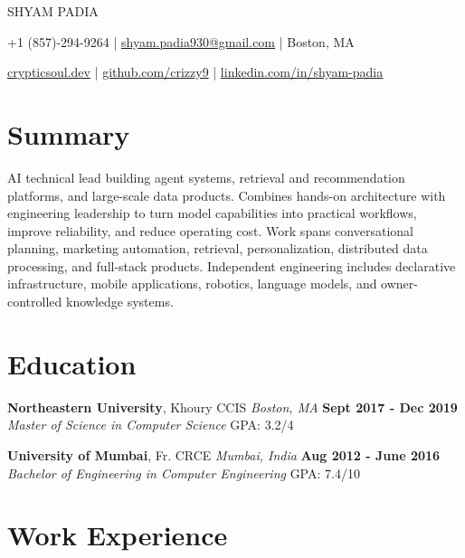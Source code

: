 \documentclass[10pt, letterpaper]{article}
\newcommand{\name}[1]{\centerline{\Large \scshape {#1}}}
\newcommand{\contactinfo}[1]{\centerline{\small #1}}
\newcommand{\educationentry}[4]{
  \noindent\textbf{#1}, #2 \hfill \textit{#3} \hfill \textbf{#4}
}
\begin{document}
\name{SHYAM PADIA}
\contactinfo{
	+1 (857)-294-9264 |
	\href{mailto:shyam.padia930@gmail.com}{shyam.padia930@gmail.com} |
	Boston, MA
}
\contactinfo{
	\href{https://crypticsoul.dev}{crypticsoul.dev} |
	\href{https://github.com/crizzy9}{github.com/crizzy9} |
	\href{https://linkedin.com/in/shyam-padia}{linkedin.com/in/shyam-padia}
}

\section{Summary}
AI technical lead building agent systems, retrieval and recommendation platforms, and large-scale data products. Combines hands-on architecture with engineering leadership to turn model capabilities into practical workflows, improve reliability, and reduce operating cost. Work spans conversational planning, marketing automation, retrieval, personalization, distributed data processing, and full-stack products. Independent engineering includes declarative infrastructure, mobile applications, robotics, language models, and owner-controlled knowledge systems.

\section{Education}

\educationentry{Northeastern University}{Khoury CCIS}{Boston, MA}{Sept 2017 - Dec 2019}\\
\textit{Master of Science in Computer Science} \hfill GPA: 3.2/4


\educationentry{University of Mumbai}{Fr. CRCE}{Mumbai, India}{Aug 2012 - June 2016}\\
\textit{Bachelor of Engineering in Computer Engineering} \hfill GPA: 7.4/10

\section{Work Experience}
\end{document}
